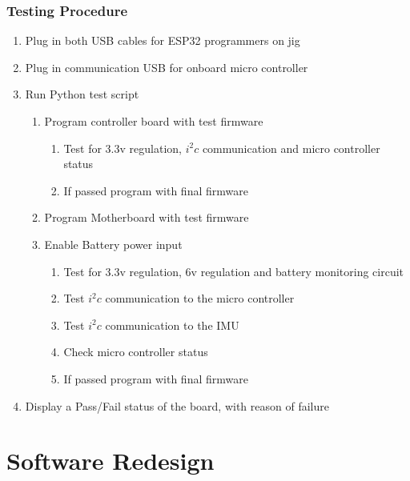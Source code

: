 \documentclass[12pt]{report}
\begin{document}
\subsection{Testing Procedure}
\label{appendix:TestingProcedure}
\begin{enumerate}
    \item Plug in both USB cables for ESP32 programmers on jig
    \item Plug in communication USB for onboard micro controller
    \item Run Python test script
    \begin{enumerate}
        \item Program controller board with test firmware
        \begin{enumerate}
            \item Test for 3.3v regulation, $i^2c$ communication and micro controller status
            \item If passed program with final firmware
        \end{enumerate}
         \item Program Motherboard with test firmware
         \item Enable Battery power input
        \begin{enumerate}
            \item Test for 3.3v regulation, 6v regulation and battery monitoring circuit
            \item Test $i^2c$ communication to the micro controller
            \item Test $i^2c$ communication to the IMU
            \item Check micro controller status
            \item If passed program with final firmware
        \end{enumerate}
    \end{enumerate}
    \item Display a Pass/Fail status of the board, with reason of failure    
\end{enumerate}

\chapter{Software Redesign}
\end{document}
